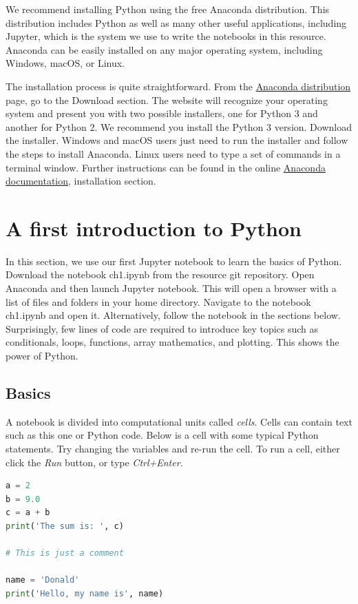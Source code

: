 \documentclass[a4paper , 12pt]{book}
\begin{document}
We recommend installing Python using the free Anaconda distribution. This distribution includes Python as well as many other useful applications, including Jupyter, which is the system we use to write the notebooks in this resource. Anaconda can be easily installed on any major operating system, including Windows, macOS, or Linux.

The installation process is quite straightforward. From the \href {https://www.anaconda.com/distribution/}{Anaconda distribution} page, go to the Download section. The website will recognize your operating system and present you with two possible installers, one for Python 3 and another for Python 2. We recommend you install the Python 3 version. Download the installer. Windows and macOS users just need to run the installer and follow the steps to install Anaconda. Linux users need to type a set of commands in a terminal window. Further instructions can be found in the online \href {https://docs.anaconda.com/anaconda/} {Anaconda documentation}, installation section.

\section{A first introduction to Python}

In this section, we use our first Jupyter notebook to learn the basics of Python. Download the notebook ch1.ipynb from the resource git repository. Open Anaconda and then launch Jupyter notebook. This will open a browser with a list of files and folders in your home directory. Navigate to the notebook ch1.ipynb and open it. Alternatively, follow the notebook in the sections below. Surprisingly, few lines of code are required to introduce key topics such as conditionals, loops, functions, array mathematics, and plotting. This shows the power of Python.

\subsection{Basics}

A notebook is divided into computational units called \textit{cells}. Cells can contain text such as this one or Python code. Below is a cell with some typical Python statements. Try changing the variables and re-run the cell. To run a cell, either click the \textit{Run} button, or type \textit{Ctrl+Enter}.

\begin{center}
\begin{lstlisting}[language=Python, frame=single]
a = 2 
b = 9.0 
c = a + b 
print('The sum is: ', c) 
 	
# This is just a comment 
	
name = 'Donald' 
print('Hello, my name is', name)
\end{lstlisting}
\end{center}
\end{document}

